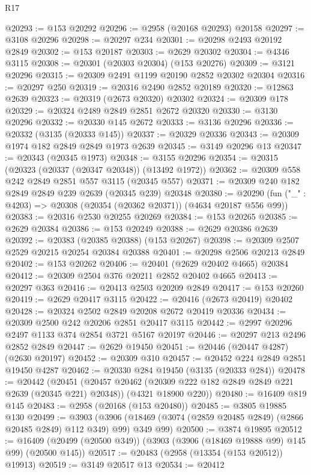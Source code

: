 \begin{lexlean}{R17}
\begin{coremodule}
@20293 := @153 @20292
@20296 := @2958 (@20168 @20293) @20158
@20297 := @3108 @20296
@20298 := @20297 @234
@20301 := @20298 @2493 @20192 @2849
@20302 := @153 @20187
@20303 := @2629 @20302
@20304 := @4346 @3115
@20308 := @20301 (@20303 @20304) (@153 @20276)
@20309 := @3121 @20296
@20315 := @20309 @2491 @1199 @20190 @2852 @20302 @20304
@20316 := @20297 @250
@20319 := @20316 @2490 @2852 @20189
@20320 := @12863 @2639
@20323 := @20319 (@2673 @20320) @20302
@20324 := @20309 @178
@20329 := @20324 @2489 @2849 @2851 @2672 @20320
@20330 := @3130 @20296
@20332 := @20330 @145 @2672
@20333 := @3136 @20296
@20336 := @20332 (@3135 (@20333 @145))
@20337 := @20329 @20336
@20343 := @20309 @1974 @182 @2849 @2849 @1973 @2639
@20345 := @3149 @20296 @13
@20347 := @20343 (@20345 @1973)
@20348 := @3155 @20296
@20354 := @20315 (@20323 (@20337 (@20347 @20348)) (@13492 @1972))
@20362 := @20309 @558 @242 @2849 @2851 @557 @3115 (@20345 @557)
@20371 := @20309 @240 @182 @2849 @2849 @239 @2639 (@20345 @239) @20348
@20380 := @20290 (fun ("_" : @4203) => @20308 (@20354 (@20362 @20371)) (@4634 @20187 @556 @99))
@20383 := @20316 @2530 @20255 @20269
@20384 := @153 @20265
@20385 := @2629 @20384
@20386 := @153 @20249
@20388 := @2629 @20386 @2639
@20392 := @20383 (@20385 @20388) (@153 @20267)
@20398 := @20309 @2507 @2529 @20215 @20254 @20384 @20388
@20401 := @20298 @2506 @20213 @2849
@20402 := @153 @20262
@20406 := @20401 (@2629 @20402 @4665) @20384
@20412 := @20309 @2504 @376 @20211 @2852 @20402 @4665
@20413 := @20297 @363
@20416 := @20413 @2503 @20209 @2849
@20417 := @153 @20260
@20419 := @2629 @20417 @3115
@20422 := @20416 (@2673 @20419) @20402
@20428 := @20324 @2502 @2849 @20208 @2672 @20419 @20336
@20434 := @20309 @2500 @242 @20206 @2851 @20417 @3115
@20442 := @2997 @20296 @2497 @1133 @374 @2854 @3721 @5167 @20197
@20446 := @20297 @213 @2496 @2852 @2849
@20447 := @2629 @19450
@20451 := @20446 (@20447 @4287) (@2630 @20197)
@20452 := @20309 @310
@20457 := @20452 @224 @2849 @2851 @19450 @4287
@20462 := @20330 @284 @19450 (@3135 (@20333 @284))
@20478 := @20442
    (@20451
      (@20457 @20462 (@20309 @222 @182 @2849 @2849 @221 @2639 (@20345 @221) @20348))
      (@4321 @18900 @220))
@20480 := @16409 @819 @145
@20483 := @2958 (@20168 (@153 @20480))
@20485 := @3805 @19885 @130
@20499 := @3903
    (@3906 (@18469 (@3074 (@2859 @20485 @2849) (@2866 @20485 @2849) @112 @349) @99) @349 @99)
@20500 := @3874 @19895
@20512 := @16409 (@20499 (@20500 @349)) (@3903 (@3906 (@18469 @19888 @99) @145 @99) (@20500 @145))
@20517 := @20483 (@2958 (@13354 (@153 @20512)) @19913)
@20519 := @3149 @20517 @13
@20534 := @20412

\end{coremodule}
\end{lexlean}
